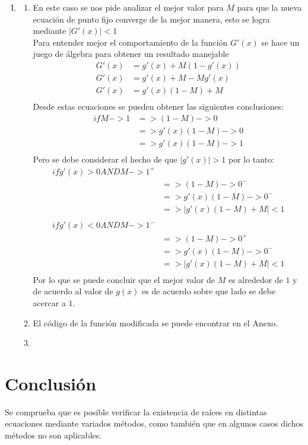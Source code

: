\documentclass{article}
\begin{document}
\begin{enumerate}[I)]
\item
\begin{enumerate}[(1)]
\item En este caso se nos pide analizar el mejor valor para $M$ para que la nueva ecuación de punto fijo converge de la mejor manera, esto se logra mediante $|G'(x)|<1$\\
Para entender mejor el comportamiento de la función $G'(x)$ se hace un juego de álgebra para obtener un resultado manejable
\begin{align*}
G'(x) & = g'(x) + M(1 - g'(x))\\
G'(x) & = g'(x) + M - Mg'(x)\\
G'(x) & = g'(x)(1 - M) + M\\
\end{align*}
Desde estas ecuaciones se pueden obtener las siguientes conclusiones:
\begin{align*}
if M -> 1 & => (1 - M) -> 0\\
& => g'(x)(1 - M) -> 0\\
& => g'(x)(1 - M) -> 1\\
\end{align*}
Pero se debe considerar el hecho de que $|g'(x)| > 1$ por lo tanto:
\begin{align*}
if g'(x) > 0 AND M -> 1^{+}\\
& => (1 - M) -> 0^{-}\\
& => g'(x)(1 - M) -> 0^{-}\\
& => |g'(x)(1 - M) + M| < 1\\
\\
if g'(x) < 0 AND M -> 1^{-}\\
& => (1 - M) -> 0^{+}\\
& => g'(x)(1 - M) -> 0^{-}\\
& => |g'(x)(1 - M) + M| < 1\\
\end{align*}
Por lo que se puede concluir que el mejor valor de $M$ es alrededor de $1$ y de acuerdo al valor de $g(x)$ es de acuerdo sobre que lado se debe acercar a $1$.
\item El código de la función modificada se puede encontrar en el Anexo.
\item 
\end{enumerate}

\end{enumerate}

\section{Conclusión}
Se comprueba que es posible verificar la existencia de raíces en distintas ecuaciones mediante variados métodos, como también que en algunos casos dichos métodos no son aplicables.
\end{document}
